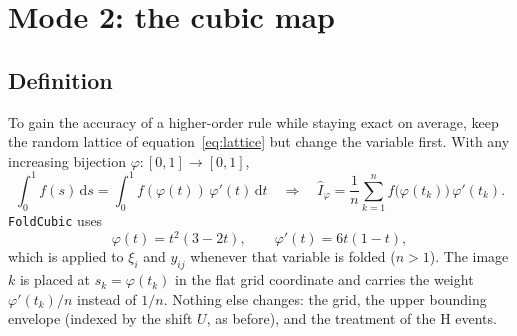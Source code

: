 \documentclass[11pt,a4paper]{article}
\newcommand{\dd}{\mathrm{d}}
\newcommand{\code}[1]{\texttt{#1}}
\begin{document}
\section{Mode 2: the cubic map}
\label{sec:cubic}

\subsection{Definition}
To gain the accuracy of a higher-order rule while staying exact on average, keep the random
lattice of equation~\eqref{eq:lattice} but change the variable first. With any increasing bijection
$\varphi:[0,1]\to[0,1]$,
\begin{equation}
  \int_0^1 f(s)\,\dd s=\int_0^1 f(\varphi(t))\,\varphi'(t)\,\dd t
  \quad\Longrightarrow\quad
  \hat I_\varphi=\frac1n\sum_{k=1}^n f\big(\varphi(t_k)\big)\,\varphi'(t_k).
  \label{eq:transformed}
\end{equation}
\code{FoldCubic} uses
\begin{equation}
  \varphi(t)=t^2(3-2t),\qquad \varphi'(t)=6t(1-t),
  \label{eq:cubic}
\end{equation}
which is applied to $\xi_i$ and $y_{ij}$ whenever that variable is folded ($n>1$). The image $k$
is placed at $s_k=\varphi(t_k)$ in the flat grid coordinate and carries the weight
$\varphi'(t_k)/n$ instead of $1/n$. Nothing else changes: the grid, the upper bounding envelope
(indexed by the shift $U$, as before), and the treatment of the H events.
\end{document}
